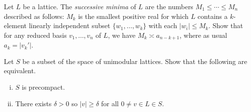 \documentclass[reqno]{amsart} 
\begin{document}
\begin{exercise}
  Let $L$ be a lattice.  The \emph{successive minima} of $L$ are the numbers $M_1 \leq \dotsb \leq M_n$ described as follows: $M_{k}$ is the smallest positive real for which $L$ contains a $k$-element linearly independent subset $\{w_1,\dotsc,w_k\}$ with each $|w_i| \leq M_k$.  Show that for any reduced basis $v_1,\dotsc,v_n$ of $L$, we have $M_k \asymp a_{n-k+1}$, where as usual $a_k = |v_k'|$.
\end{exercise}



\begin{exercise}\label{thm:mahler-criterion}
  Let $S$ be a subset of the space of unimodular lattices.  Show that the following are equivalent.
  \begin{enumerate} [(i)]
  \item $S$ is precompact.
  \item There exists $\delta > 0$ so $|v| \geq \delta$ for all $0 \neq v \in L \in S$.
  \end{enumerate}
\end{exercise}

\end{document}
